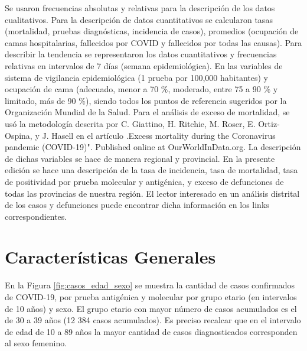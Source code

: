 \documentclass[12pt,a4paper,openany]{book}
\begin{document}
	Se usaron frecuencias absolutas y relativas para la descripción de los datos cualitativos. Para la
	descripción de datos cuantitativos se calcularon tasas (mortalidad, pruebas diagnósticas, incidencia de
	casos), promedios (ocupación de camas hospitalarias, fallecidos por COVID y fallecidos por todas las
	causas). Para describir la tendencia se representaron los datos cuantitativos y frecuencias relativas en
	intervalos de 7 días (semana epidemiológica). En las variables de sistema de vigilancia epidemiológica
		(1 prueba por 100,000 habitantes) y ocupación de cama (adecuado, menor a 70 $\%$, moderado,
	entre 75 a 90  $\%$ y limitado, más de 90 $\%$), siendo todos los puntos de referencia sugeridos por la
	Organización Mundial de la Salud. Para el análisis de exceso de mortalidad, se usó la metodología
	descrita por C. Giattino, H. Ritchie, M. Roser, E. Ortiz-Ospina, y J. Hasell en el artículo .Excess
	mortality during the Coronavirus pandemic (COVID-19)". Published online at OurWorldInData.org.
	La descripción de dichas variables se hace de manera regional y provincial. En la presente edición
	se hace una descripción de la tasa de incidencia, tasa de mortalidad, tasa de positividad por prueba
	molecular y antigénica, y exceso de defunciones de todas las provincias de nuestra región. El lector
	interesado en un análisis distrital de los casos y defunciones puede encontrar dicha información en
	los links correspondientes.
	
	
	\clearpage	
	\section*{Características Generales}
	
	
	
	\noindent En la Figura \ref{fig:casos_edad_sexo} se muestra la cantidad de casos confirmados de COVID-19, por prueba antigénica y molecular por grupo etario (en intervalos de 10 años) y sexo. El grupo etario con mayor número de casos acumulados es el de 30 a 39 años (12 384 casos acumulados). 	Es preciso recalcar que en el intervalo de edad de 10 a 89 años la mayor cantidad de casos diagnosticados corresponden al sexo femenino.  
	
\end{document}
